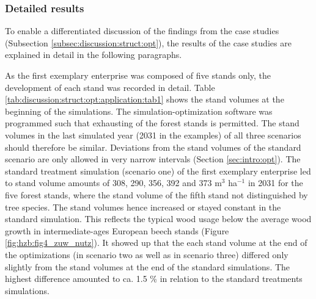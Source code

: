 \subsubsection{Detailed results}
\label{subsubsec:discussion:struct:opt:application:results}
To enable a differentiated discussion of the findings from the case studies (Subsection \ref{subsec:discussion:struct:opt}), the results of the case studies are explained in detail in the following paragraphs.

As the first exemplary enterprise was composed of five stands only, the development of each stand was recorded in detail. Table \ref{tab:discussion:struct:opt:application:tab1} shows the stand volumes at the beginning of the simulations. The si\-mu\-la\-tion-op\-ti\-mi\-za\-tion software was programmed such that exhausting of the forest stands is permitted. The stand volumes in the last simulated year (2031 in the examples) of all three scenarios should therefore be similar. Deviations from the stand volumes of the standard scenario are only allowed in very narrow intervals (Section \ref{sec:intro:opt}). The standard treatment simulation (scenario one) of the first exemplary enterprise led to stand volume amounts of 308, 290, 356, 392 and 373 m$^3$ ha$^{-1}$ in 2031 for the five forest stands, where the stand volume of the fifth stand not distinguished by tree species. The stand volumes hence increased or stayed constant in the standard simulation. This reflects the typical wood usage below the average wood growth in intermediate-ages European beech stands (Figure \ref{fig:hzb:fig4_zuw_nutz}). It showed up that the each stand volume at the end of the optimizations (in scenario two as well as in scenario three) differed only slightly from the stand volumes at the end of the standard simulations. The highest difference amounted to ca. 1.5 \% in relation to the standard treatments simulations.

